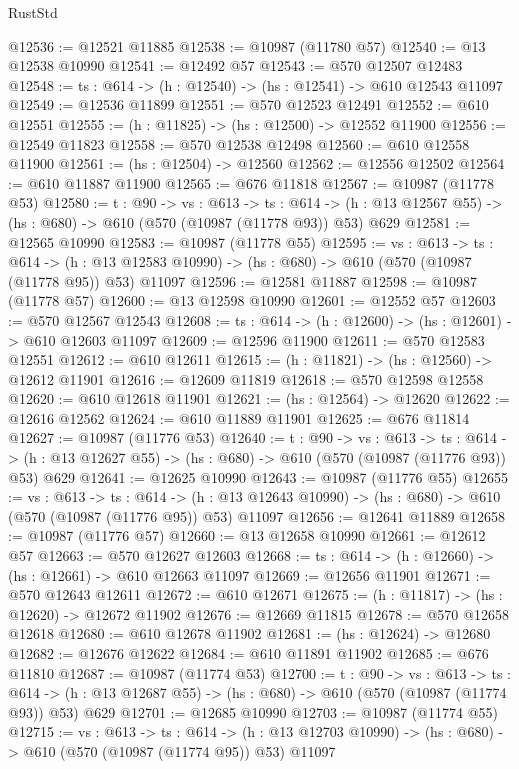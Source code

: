 \begin{lexlean}{RustStd}
\begin{coremodule}
@12536 := @12521 @11885
@12538 := @10987 (@11780 @57)
@12540 := @13 @12538 @10990
@12541 := @12492 @57
@12543 := @570 @12507 @12483
@12548 := {ts : @614} -> (h : @12540) -> (hs : @12541) -> @610 @12543 @11097
@12549 := @12536 @11899
@12551 := @570 @12523 @12491
@12552 := @610 @12551
@12555 := (h : @11825) -> (hs : @12500) -> @12552 @11900
@12556 := @12549 @11823
@12558 := @570 @12538 @12498
@12560 := @610 @12558 @11900
@12561 := (hs : @12504) -> @12560
@12562 := @12556 @12502
@12564 := @610 @11887 @11900
@12565 := @676 @11818
@12567 := @10987 (@11778 @53)
@12580 := {t : @90} ->
  {vs : @613} ->
  {ts : @614} -> (h : @13 @12567 @55) -> (hs : @680) -> @610 (@570 (@10987 (@11778 @93)) @53) @629
@12581 := @12565 @10990
@12583 := @10987 (@11778 @55)
@12595 := {vs : @613} ->
  {ts : @614} ->
  (h : @13 @12583 @10990) -> (hs : @680) -> @610 (@570 (@10987 (@11778 @95)) @53) @11097
@12596 := @12581 @11887
@12598 := @10987 (@11778 @57)
@12600 := @13 @12598 @10990
@12601 := @12552 @57
@12603 := @570 @12567 @12543
@12608 := {ts : @614} -> (h : @12600) -> (hs : @12601) -> @610 @12603 @11097
@12609 := @12596 @11900
@12611 := @570 @12583 @12551
@12612 := @610 @12611
@12615 := (h : @11821) -> (hs : @12560) -> @12612 @11901
@12616 := @12609 @11819
@12618 := @570 @12598 @12558
@12620 := @610 @12618 @11901
@12621 := (hs : @12564) -> @12620
@12622 := @12616 @12562
@12624 := @610 @11889 @11901
@12625 := @676 @11814
@12627 := @10987 (@11776 @53)
@12640 := {t : @90} ->
  {vs : @613} ->
  {ts : @614} -> (h : @13 @12627 @55) -> (hs : @680) -> @610 (@570 (@10987 (@11776 @93)) @53) @629
@12641 := @12625 @10990
@12643 := @10987 (@11776 @55)
@12655 := {vs : @613} ->
  {ts : @614} ->
  (h : @13 @12643 @10990) -> (hs : @680) -> @610 (@570 (@10987 (@11776 @95)) @53) @11097
@12656 := @12641 @11889
@12658 := @10987 (@11776 @57)
@12660 := @13 @12658 @10990
@12661 := @12612 @57
@12663 := @570 @12627 @12603
@12668 := {ts : @614} -> (h : @12660) -> (hs : @12661) -> @610 @12663 @11097
@12669 := @12656 @11901
@12671 := @570 @12643 @12611
@12672 := @610 @12671
@12675 := (h : @11817) -> (hs : @12620) -> @12672 @11902
@12676 := @12669 @11815
@12678 := @570 @12658 @12618
@12680 := @610 @12678 @11902
@12681 := (hs : @12624) -> @12680
@12682 := @12676 @12622
@12684 := @610 @11891 @11902
@12685 := @676 @11810
@12687 := @10987 (@11774 @53)
@12700 := {t : @90} ->
  {vs : @613} ->
  {ts : @614} -> (h : @13 @12687 @55) -> (hs : @680) -> @610 (@570 (@10987 (@11774 @93)) @53) @629
@12701 := @12685 @10990
@12703 := @10987 (@11774 @55)
@12715 := {vs : @613} ->
  {ts : @614} ->
  (h : @13 @12703 @10990) -> (hs : @680) -> @610 (@570 (@10987 (@11774 @95)) @53) @11097

\end{coremodule}
\end{lexlean}
